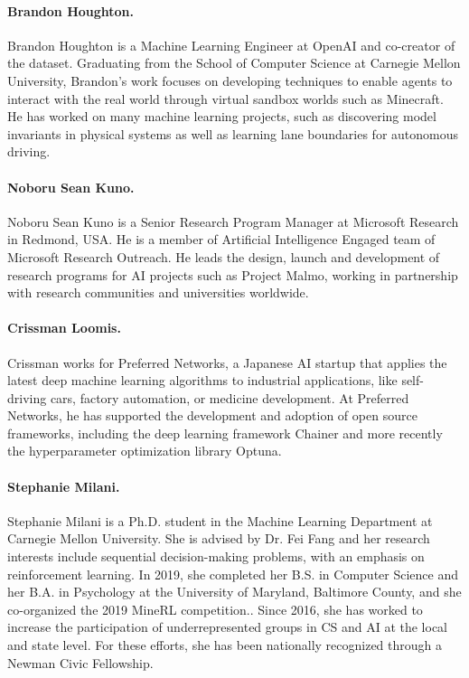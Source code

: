 \paragraph{Brandon Houghton.} Brandon Houghton is a Machine Learning Engineer at OpenAI and co-creator of the \minenet{} dataset. Graduating from the School of Computer Science at Carnegie Mellon University, Brandon's work focuses on developing techniques to enable agents to interact with the real world through virtual sandbox worlds such as Minecraft. He has worked on many machine learning projects, such as discovering model invariants in physical systems as well as learning lane boundaries for autonomous driving. 

\paragraph{Noboru Sean Kuno.} Noboru Sean Kuno is a Senior Research Program Manager at Microsoft Research in Redmond, USA. He is a member of Artificial Intelligence Engaged team of Microsoft Research Outreach. He leads the design, launch and development of research programs for AI projects such as Project Malmo, working in partnership with research communities and universities worldwide.

\paragraph{Crissman Loomis.} Crissman works for Preferred Networks, a Japanese AI startup that applies the latest deep machine learning algorithms to industrial applications, like self-driving cars, factory automation, or medicine development. At Preferred Networks, he has supported the development and adoption of open source frameworks, including the deep learning framework Chainer and more recently the hyperparameter optimization library Optuna.

\paragraph{Stephanie Milani.} Stephanie Milani is a Ph.D. student in the Machine Learning Department at Carnegie Mellon University.
She is advised by Dr. Fei Fang and her research interests include sequential decision-making problems, with an emphasis on reinforcement learning.
In 2019, she completed her B.S. in Computer Science and her B.A. in Psychology at the University of Maryland, Baltimore County, and she co-organized the 2019 MineRL competition..
Since 2016, she has worked to increase the participation of underrepresented groups in CS and AI at the local and state level. 
For these efforts, she has been nationally recognized 
through a Newman Civic Fellowship. 

